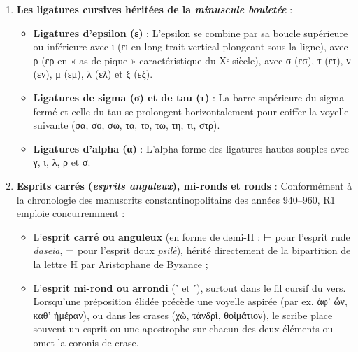 \documentclass[11pt, a4paper, twoside]{article}
\renewcommand{\_}{\origunderscore\penalty0\relax}
\renewcommand{\texttt}[1]{#1}
\newcommand{\Run}{\textbf{R}\textsuperscript{1}}
\def\Run{R1}%
\begin{document}
\begin{enumerate}[leftmargin=1.6em, itemsep=2pt]
  \item \textbf{Les ligatures cursives héritées de la \textit{minuscule bouletée}} :
  \begin{itemize}[leftmargin=1.5em, itemsep=2pt]
    \item \textbf{Ligatures d'epsilon (ε)} : L'epsilon se combine par sa boucle supérieure ou inférieure avec ι (ει en long trait vertical plongeant sous la ligne), avec ρ (ερ en « as de pique » caractéristique du Xᵉ siècle), avec σ (εσ), τ (ετ), ν (εν), μ (εμ), λ (ελ) et ξ (εξ).
    \item \textbf{Ligatures de sigma (σ) et de tau (τ)} : La barre supérieure du sigma fermé et celle du tau se prolongent horizontalement pour coiffer la voyelle suivante (σα, σο, σω, τα, το, τω, τη, τι, στρ).
    \item \textbf{Ligatures d'alpha (α)} : L'alpha forme des ligatures hautes souples avec γ, ι, λ, ρ et σ.
  \end{itemize}

  \item \textbf{Esprits carrés (\textit{esprits anguleux}), mi-ronds et ronds} : Conformément à la chronologie des manuscrits constantinopolitains des années 940–960, \Run{} emploie concurremment :
  \begin{itemize}[leftmargin=1.5em, itemsep=2pt]
    \item L'\textbf{esprit carré ou anguleux} (en forme de demi-H : \texttt{⊢} pour l'esprit rude \textit{daseia}, \texttt{⊣} pour l'esprit doux \textit{psilè}), hérité directement de la bipartition de la lettre \texttt{Η} par Aristophane de Byzance ;
    \item L'\textbf{esprit mi-rond ou arrondi} (\texttt{῾} et \texttt{᾿}), surtout dans le fil cursif du vers. Lorsqu'une préposition élidée précède une voyelle aspirée (par ex. \texttt{ἀφ' ὧν}, \texttt{καθ' ἡμέραν}), ou dans les crases (\texttt{χὠ}, \texttt{τἀνδρὶ}, \texttt{θοἰμάτιον}), le scribe place souvent un esprit ou une apostrophe sur chacun des deux éléments ou omet la coronis de crase.
  \end{itemize}


\end{enumerate}
\end{document}
